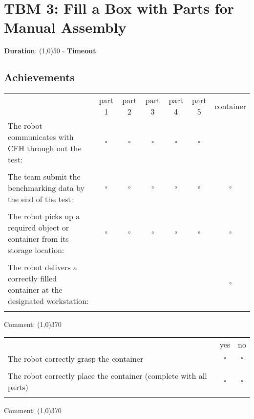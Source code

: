 \section*{TBM 3: Fill a Box with Parts for Manual Assembly}

\noindent \textbf{Duration}: \line(1,0){50} \hspace{0.5cm} $\square$ \textbf{Timeout}

\subsection*{Achievements}
\begin{tabular}{ p{5cm} c c c c c c}
 & part 1 & part 2 & part 3 & part 4 & part 5 & container \\ 
The robot communicates with CFH through out the test: & $\square$ & $\square$ & $\square$ & $\square$ & $\square$ & \\ \\
The team submit the benchmarking data by the end of the test: & $\square$ & $\square$ & $\square$ & $\square$ & $\square$ & $\square$\\ \\
The robot picks up a required object or container from its storage location: & $\square$ & $\square$ & $\square$ & $\square$ & $\square$ & $\square$ \\ \\
The robot delivers a correctly filled container at the designated workstation: & & & & & & $\square$ \\ \\
\end{tabular}

\vspace{0.2cm}
Comment: \line(1,0){370}
\vspace{0.6cm}

\noindent
\begin{tabular}{ l c c}
 & yes & no \\ 
The robot correctly grasp the container & $\square$ & $\square$ \\ \\
The robot correctly place the container (complete with all parts) & $\square$ & $\square$ \\ \\
\end{tabular}

\vspace{0.2cm}
Comment: \line(1,0){370}


